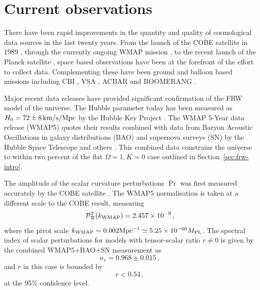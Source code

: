 \section{Current observations}
\label{sec:obs-intro}
There have been rapid improvements in the quantity and quality of cosmological data
sources in the last twenty years. From the launch of the COBE satellite in
1989 \cite{Bennett1994, Bennett1996c}, through the currently
ongoing WMAP mission \cite{spergel, Komatsu:2008hk}, to the recent launch of the
Planck satellite \cite{planck}, space based observations have been at the
forefront of the effort to collect data. Complementing these have been ground
and balloon based missions including CBI
\cite{Mason2003b, Sievers2003, Sievers2007}, VSA \cite{Dickinson2004}, ACBAR
\cite{Kuo2004, Kuo2007} and BOOMERANG \cite{Ruhl2003, Montroy2006,
Piacentini2006}.

Major recent data releases have provided significant confirmation of the FRW
model of the universe. The Hubble parameter today has been measured as $H_0 =
72\pm8\,\mathrm{km}/\mathrm{s}/\mathrm{Mpc}$ by the Hubble Key Project
\cite{Freedman2001}. The WMAP 5-Year data release (WMAP5) \cite{Komatsu:2008hk}
quotes their results combined with
data from Baryon
Acoustic Oscillations in galaxy distributions (BAO) \cite{Percival2007}
and supernova surveys (SN) by the Hubble Space Telescope and others \cite{Riess2004,
Riess2007, Astier2006, Wood-Vasey2007}. 
This combined data constrains the
universe to within two percent of the flat $\Omega =1, K=0$ case outlined in
Section~\ref{sec:frw-intro}. 

The amplitude of the scalar curvature perturbations $\Pr$ was first measured
accurately by the COBE satellite \cite{Bennett1994, Bennett1996c}. The WMAP5
normalisation is taken at a different scale to the COBE result, measuring
% 
\begin{equation}
 \label{eq:wmapnorm-intro}
 \mathcal{P}_{\mathcal{R}}^2 (k_\mathrm{WMAP}) = 2.457 \times 10^{-9}\,,
\end{equation}
% 
where the pivot scale $k_\mathrm{WMAP} = 0.002\mathrm{Mpc}^{-1} \simeq 5.25\times 10^{-60}M_{\mathrm{PL}}$. The
spectral index of scalar perturbations for models with tensor-scalar ratio
$r\ne0$ is given by the combined WMAP5+BAO+SN measurement as
% 
\begin{equation}
 \label{eq:wmapns-intro}
 n_s = 0.968 \pm 0.015\,,
\end{equation}
% 
and $r$ in this case is bounded by
% 
\begin{equation}
\label{eq:rbound-intro}
 r < 0.54\,,
\end{equation}
at the 95\% confidence level.






